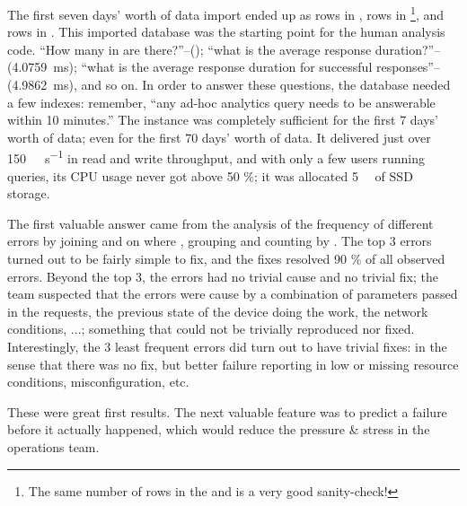 \documentclass[10 pt, twocolumn]{article}
\begin{document}
The first seven days' worth of data import ended up as  rows in ,  rows in \footnote{The same number of rows in the  and  is a very good sanity-check!}, and  rows in . This imported database was the starting point for the human analysis code. ``How many  in  are there?''--(); ``what is the average response duration?''--(\SI{4.0759}{\milli\second}); ``what is the average response duration for successful responses''--(\SI{4.9862}{\milli\second}), and so on. In order to answer these questions, the database needed a few indexes: remember, ``any ad-hoc analytics query needs to be answerable within 10 minutes.'' The  instance was completely sufficient for the first 7 days' worth of data; even for the first 70 days' worth of data. It delivered just over \SI{150}{\mebi\byte\per\second} in read and write throughput, and with only a few users running queries, its CPU usage never got above 50 \%; it was allocated \SI{5}{\tebi\byte} of SSD storage. 

The first valuable answer came from the analysis of the frequency of different errors by joining  and  on  where , grouping and counting by . The top 3 errors turned out to be fairly simple to fix, and the fixes resolved 90 \% of all observed errors. Beyond the top 3, the errors had no trivial cause and no trivial fix; the team suspected that the errors were cause by a combination of parameters passed in the requests, the previous state of the device doing the work, the network conditions, ...; something that could not be trivially reproduced nor fixed. Interestingly, the 3 least frequent errors did turn out to have trivial fixes: in the sense that there was no fix, but better failure reporting in low or missing resource conditions, misconfiguration, etc.

These were great first results. The next valuable feature was to predict a failure before it actually happened, which would reduce the pressure \& stress in the operations team. 
\end{document}
